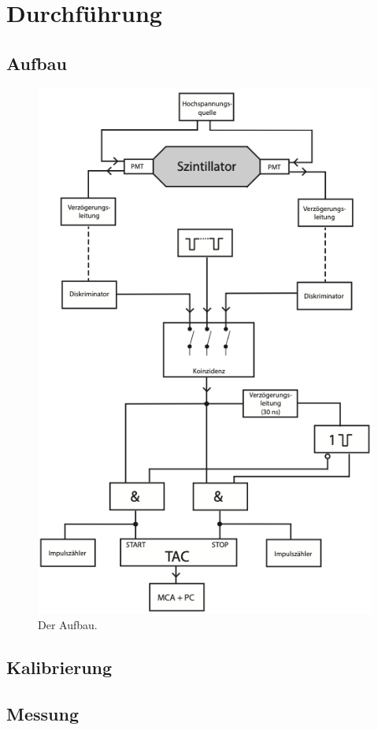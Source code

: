 \section{Durchführung}

\subsection{Aufbau}

\begin{figure}
    \centering
    \includegraphics[width=0.7\linewidth]{figures/Aufbau.png}
    \caption{Der Aufbau. \cite{}}
    \label{fig:Aufbau}
\end{figure}

\subsection{Kalibrierung}

\subsection{Messung}